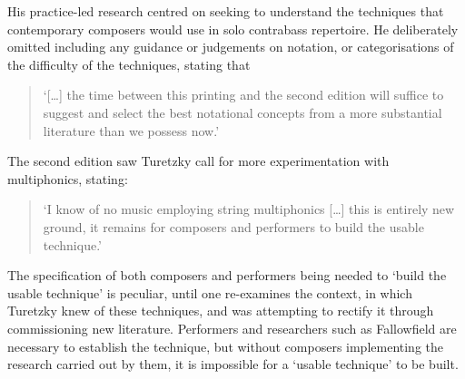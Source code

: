 His practice-led research centred on seeking to understand the techniques that contemporary composers would use in solo contrabass repertoire. He deliberately omitted including any guidance or judgements on notation, or categorisations of the difficulty of the techniques, stating that \begin{quote}
    ‘[…] the time between this printing and the second edition will suffice to suggest and select the best notational concepts from a more substantial literature than we possess now.’\autocite{turetzkyContemporaryContrabass1974} 
\end{quote}The second edition saw Turetzky call for more experimentation with multiphonics, stating:
\begin{quote}
    ‘I know of no music employing string multiphonics […] this is entirely new ground, it remains for composers and performers to build the usable technique.’\autocite[138]{turetzkyContemporaryContrabass1992}
\end{quote}
The specification of both composers and performers being needed to ‘build the usable technique’ is peculiar, until one re-examines the context, in which Turetzky knew of these techniques, and was attempting to rectify it through commissioning new literature. Performers and researchers such as Fallowfield are necessary to establish the technique, but without composers implementing the research carried out by them, it is impossible for a ‘usable technique’ to be built.
